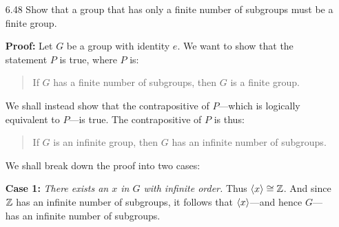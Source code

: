 \begin{enumerate}
\begin{enumerate}
               \textbf{Proof}: See 6.47(c) below. \qed
         \item We claim that $rs = ld$, where $d = \gcd(r, s)$.

               \textbf{Proof:} Let $d = \gcd(r, s)$. It suffices to show that
               $rs/d$ is the lcm of $r$ and $s$. It is clear that $r$ and $s$
               each divides $rs/d$. So to complete the proof we must show that
               if $r$ and $s$ each divides a positive integer $m$, then $rs/d$ 
               divides $m$. Let $m$ be a positive integer such that $r \mid m$
               and $s \mid m$. That is $m = ra = sb$ for some positive integers
               $a$ and $b$. Also since $d \mid r$ and $d \mid s$, we can write
               $r = dr'$ and $s = ds'$ for some positive integers $r'$ and
               $s'$. Now divide the equality $ra = sb$ by $d$ to get
               $r'a = s'b$. Observe that $r'$ and $s'$ are relatively prime, so
               that $s' \mid a$. That is $rs' \mid ra$. But $(rs/d) = rs'$ and
               $ra = m$. Hence $(rs/d)\mid m$. It follows that $rs/d$ is the lcm
               of $r$ and $s$. \qed

      \end{enumerate}
   \item[6.48] Show that a group that has only a finite number of subgroups must
               be a finite group.

      \textbf{Proof:} Let $G$ be a group with identity $e$. We want to show that 
      the statement $P$ is true, where $P$ is:
      \begin{quote}
         If $G$ has a finite number of subgroups, then $G$ is a finite group.
      \end{quote}
      We shall instead show that the contrapositive of $P$---which is logically 
      equivalent to $P$---is true. The contrapositive of $P$ is thus:
      \begin{quote}
         If $G$ is an infinite group, then $G$ has an infinite number of 
         subgroups.
      \end{quote}

      We shall break down the proof into two cases:

      \textbf{Case 1:} \textit{There exists an $x$ in $G$ with infinite order.}
      Thus $\langle x \rangle \cong \mathbb{Z}$. And since $\mathbb{Z}$ has an infinite number of
      subgroups, it follows that $\langle x \rangle$---and hence $G$---has an infinite 
      number of subgroups.


\end{enumerate}

